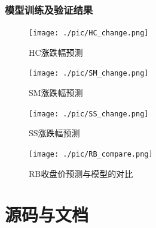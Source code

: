 \documentclass[a4paper,11pt]{ctexart}
\begin{document}
\subsubsection{模型训练及验证结果}
\FloatBarrier
\noindent
\begin{figure}[H]
  \centering
  \texttt{[image: ./pic/HC\_change.png]}
  \caption*{HC涨跌幅预测}
\end{figure}
\begin{figure}[H]
  \centering
  \texttt{[image: ./pic/SM\_change.png]}
  \caption*{SM涨跌幅预测}
\end{figure}
\begin{figure}[H]
  \centering
  \texttt{[image: ./pic/SS\_change.png]}
  \caption*{SS涨跌幅预测}
\end{figure}
\begin{figure}[H]
  \centering
  \texttt{[image: ./pic/RB\_compare.png]}
  \caption*{RB收盘价预测与模型的对比}
\end{figure}
\section{源码与文档}
\end{document}
